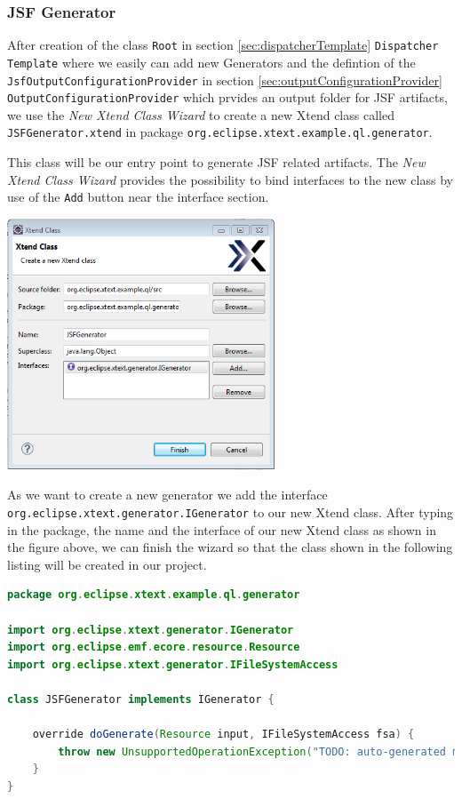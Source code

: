 \subsubsection {JSF Generator}
\label{sec:jsfGenerator}

After creation of the class \texttt{Root} in section
\ref{sec:dispatcherTemplate} \texttt{Dispatcher Template} where we easily can
add new Generators and the defintion of the
\texttt{JsfOutputConfigurationProvider} in section \ref{sec:outputConfigurationProvider}
\texttt{OutputConfigurationProvider} which prvides an output folder for JSF
artifacts, we use the \emph{New Xtend Class Wizard} to create a new Xtend class
called \texttt{JSFGenerator.xtend} in package \texttt{org.eclipse.xtext.example.ql.generator}.

This class will be our entry point to generate JSF related artifacts. The
\emph{New Xtend Class Wizard} provides the possibility to bind interfaces to the
new class by use of the \texttt{Add} button near the interface section.

\begin{center}
\includegraphics[width=8cm]{./images/chapter02/newXtendClassWizard.png}
\end{center}

As we want to create a new generator we add the interface
\texttt{org.eclipse.xtext.generator.IGenerator} to our new Xtend class.
After typing in the package, the name and the interface of our new Xtend class
as shown in the figure above, we can finish the
wizard so that the class shown in the following listing
will be created in our project.

\begin{lstlisting}[language=Java] 
package org.eclipse.xtext.example.ql.generator

import org.eclipse.xtext.generator.IGenerator
import org.eclipse.emf.ecore.resource.Resource
import org.eclipse.xtext.generator.IFileSystemAccess

class JSFGenerator implements IGenerator {
	
	override doGenerate(Resource input, IFileSystemAccess fsa) {
		throw new UnsupportedOperationException("TODO: auto-generated method stub")
	}
}
\end{lstlisting}

